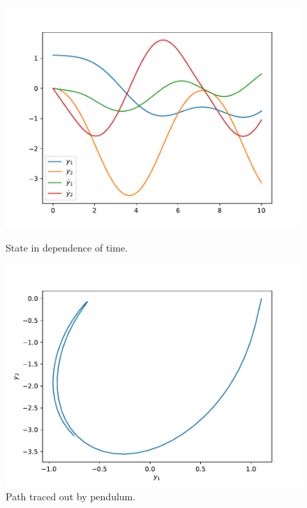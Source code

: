 \documentclass{report}
\begin{document}
\begin{figure}[h]
\centering
\begin{minipage}[b]{0.45\textwidth}
\centering
\includegraphics[width=\textwidth]{../Plots/Task4/Figure_1}
\caption{State in dependence of time.}
\label{pl:StateTime1}
\end{minipage}
\hfill
\begin{minipage}[b]{0.45\textwidth}
\centering
\includegraphics[width=\textwidth]{../Plots/Task4/Figure_2}
\caption{Path traced out by pendulum.}
\label{pl:PhasePortrait1}
\end{minipage}
\end{figure}
\end{document}
